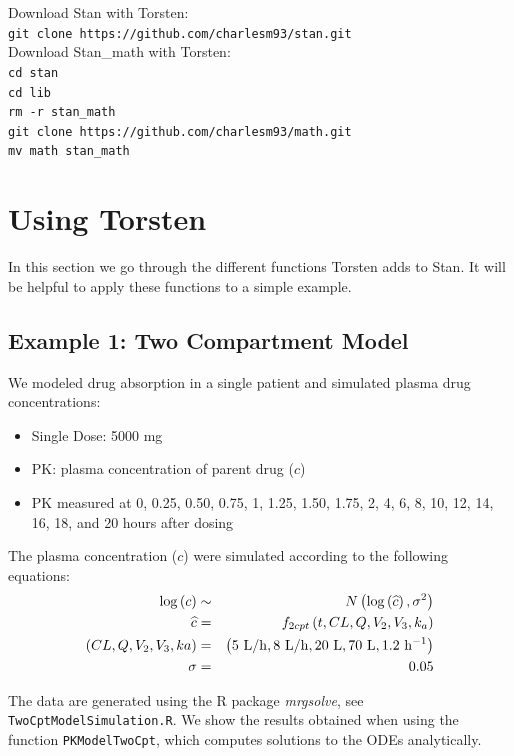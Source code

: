 \documentclass[11pt]{amsart}
\let\oldsection\section
\renewcommand\section{\clearpage\oldsection}
\begin{document}
Download Stan with Torsten: \\
\texttt{git clone https://github.com/charlesm93/stan.git} \\

Download Stan\_math with Torsten: \\
\texttt{cd stan \\
cd lib \\
rm -r stan\_math \\
git clone https://github.com/charlesm93/math.git \\
mv math stan\_math} \\

\section{Using Torsten}

In this section we go through the different functions Torsten adds to Stan. It will be helpful to apply these functions to a simple example.

\subsection*{Example 1: Two Compartment Model}
We modeled drug absorption in a single patient and simulated plasma drug concentrations:
\begin{itemize}
  \item Single Dose: 5000 mg
  \item PK: plasma concentration of parent drug ($c$)
  \item PK measured at 0, 0.25, 0.50, 0.75, 1, 1.25, 1.50, 1.75, 2, 4, 6, 8, 10, 12, 14, 16, 18, and 20 hours after dosing
\end{itemize}

The plasma concentration ($c$) were simulated according to the following equations:
\begin{eqnarray*}
\log\left(c\right) &\sim& N\left(\log\left(\widehat{c}\right),\sigma^2\right) \\
 \widehat{c} &=& f_{2cpt}\left(t, CL, Q, V_2, V_3, k_a\right) \\
  \left(CL, Q, V_2, V_3, ka\right) &=& 
	\left(5\ {\rm L/h}, 8\  {\rm L/h}, 20\  {\rm L},  70\ {\rm L}, 1.2\ {\rm h^{-1}} \right) \\
  \sigma &=& 0.05
\end{eqnarray*}

The data are generated using the R package \textit{mrgsolve}, see \texttt{TwoCptModelSimulation.R}. We show the results obtained when using the function \texttt{PKModelTwoCpt}, which computes solutions to the ODEs analytically.
\end{document}
